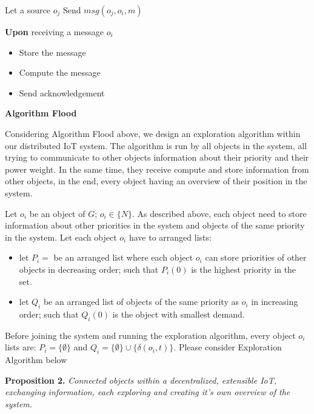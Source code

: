 \documentclass[../main/Self-Stabilization.tex]{subfiles}
\begin{document}
\LinesNumbered
\IncMargin{1em}
\begin{algorithm}
Let a source $o_{j}$
\BlankLine
{} {
     {	
        Send \emph{$msg(o_{j},o_{i},m)$} \newline
    }
}
 {

\textbf{Upon} receiving a message $o_{i}$
\begin{itemize}
  \item Store the message
  \item Compute the message
  \item Send acknowledgement
\end{itemize}
}
\caption{\textbf{Algorithm Flood}} \label{flood}
\end{algorithm}
\DecMargin{1em}


Considering Algorithm Flood above, we design an exploration algorithm within our distributed IoT system. The algorithm is run by all objects in the system, all trying to communicate to other objects information about their priority and their power weight. In the same time, they receive compute and store information from other objects, in the end, every object having an overview of their position in the system.

Let $o_{i}$ be an object of $G$; $o_{i} \in\{N\}$. As described above, each object need to store information about other priorities in the system and objects of the same priority in the system. Let each object $o_{i}$ have to arranged lists:
\begin{itemize}
    \item let $P_{i}=$ be an arranged list where each object $o_{i}$ can store priorities of other objects in decreasing order; such that $P_{i}(0)$ is the highest priority in the set.
    \item let $Q_{i}$ be an arranged list of objects of the same priority as $o_{i}$ in increasing order; such that $Q_{i}(0)$ is the object with smallest demand.
\end{itemize}

Before joining the system and running the exploration algorithm, every object $o_{i}$ lists are: $P_{i}=\{\emptyset\}$ and $Q_{i}=\{\emptyset\}\cup\{\delta(o_{i},t)\}$. Please consider Exploration Algorithm below

\textbf{Proposition 2.} \emph{Connected objects within a decentralized, extensible IoT, exchanging information, each exploring and creating it's own overview of the system.}
\end{document}
